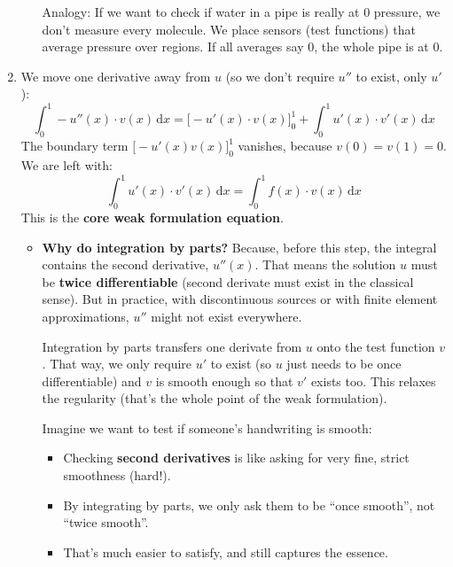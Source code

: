 \begin{enumerate}
\begin{itemize}
        Analogy: If we want to check if water in a pipe is really at 0 pressure, we don't measure every molecule. We place sensors (test functions) that average pressure over regions. If all averages say 0, the whole pipe is at 0.
    \end{itemize}


    \item {} We move one derivative away from $u$ (so we don't require $u''$ to exist, only $u'$):
    \begin{equation*}
        \displaystyle\int_0^1 -u''(x) \cdot v(x)\, \mathrm{d}x = \Big[ -u'(x) \cdot v(x) \Big]_0^1 + \displaystyle\int_0^1 u'(x) \cdot v'(x)\, \mathrm{d}x
    \end{equation*}
    The boundary term $\Big[-u'(x) v(x)\Big]_0^1$ vanishes, because $v(0)=v(1)=0$. We are left with:
    \begin{equation}
        \displaystyle\int_0^1 u'(x) \cdot v'(x)\, \mathrm{d}x = \displaystyle\int_0^1 f(x) \cdot v(x)\, \mathrm{d}x
    \end{equation}
    This is the \textbf{core weak formulation equation}.
    \begin{itemize}
        \item[\textcolor{Green3}{\faIcon{question-circle}}] \textcolor{Green3}{\textbf{Why do integration by parts?}} Because, before this step, the integral contains the second derivative, $u''(x)$. That means the solution $u$ must be \textbf{twice differentiable} (second derivate must exist in the classical sense). But in practice, with discontinuous sources or with finite element approximations, $u''$ might not exist everywhere.
        
        Integration by parts transfers one derivate from $u$ onto the test function $v$. That way, we only require $u'$ to exist (so $u$ just needs to be once differentiable) and $v$ is smooth enough so that $v'$ exists too. This relaxes the regularity (that's the whole point of the weak formulation).

        \begin{examplebox}
            Imagine we want to test if someone's handwriting is smooth:
            \begin{itemize}
                \item Checking \textbf{second derivatives} is like asking for very fine, strict smoothness (hard!).
                \item By integrating by parts, we only ask them to be ``once smooth'', not ``twice smooth''.
                \item That's much easier to satisfy, and still captures the essence.
            \end{itemize}
        \end{examplebox}


\end{itemize}
\end{enumerate}
